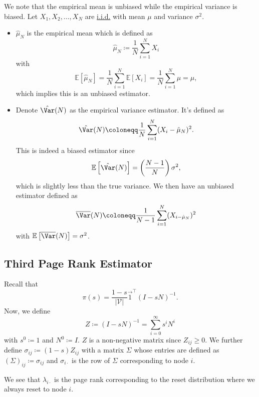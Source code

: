 \begin{note}
	We note that the empirical mean is unbiased while the empirical variance is biased. Let \(X_1, X_2, \dots  ,X_N\) are \hyperref[def:i.i.d.]{i.i.d.} with mean \(\mu\) and variance \(\sigma^2\).
	\begin{itemize}
		\item\(\hat{\mu}_N\) is the empirical mean which is defined as
		\[
			\hat{\mu}_N \coloneqq  \frac{1}{N}\sum\limits_{i=1}^{N} X_i
		\]
		with
		\[
			\mathbb{E}\left[\hat{\mu}_N \right] = \frac{1}{N}\sum\limits_{i=1}^{N} \mathbb{E}\left[X_i \right] = \frac{1}{N}\sum\limits_{i=1}^{N} \mu = \mu,
		\]
		which implies this is an unbiased estimator.
		\item Denote \(\hat{\Var}(N)\) as the empirical variance estimator. It's defined as
		      \[
			      \hat{\Var}(N) \coloneqq \frac{1}{N}\sum\limits_{i=1}^{N} (X_i - \hat{\mu}_N)^2.
		      \]
		      This is indeed a biased estimator since
		      \[
			      \mathbb{E}\left[\hat{\Var}(N) \right]  = \left(\frac{N-1}{N}\right) \sigma^2,
		      \]
		      which is slightly less than the true variance. We then have an unbiased estimator defined as
		      \[
			      \overline{\Var}(N) \coloneqq  \frac{1}{N-1}\sum\limits_{i=1}^{N} (X_{i-\hat{\mu}_N})^2
		      \]
		      with \(\mathbb{E}\left[\overline{\Var}(N) \right]  = \sigma^2\).
	\end{itemize}
\end{note}

\subsection{Third Page Rank Estimator}\label{subsec:third-page-rank-estimator}
Recall that
\[
	\pi(s) = \frac{1 - s}{\left\vert \mathcal{V}  \right\vert}\vec{1}^{\top} (I - sN)^{-1}.
\]
Now, we define
\[
	Z \coloneqq (I - sN)^{-1} = \sum\limits_{i=0}^{\infty} s^i N^i
\]
with \(s^0\coloneqq 1\) and \(N^0\coloneqq I\). \(Z\) is a non-negative matrix since \(Z_{ij}\geq 0\). We further define \(\sigma_{ij}\coloneqq (1 - s)Z_{ij}\) with a matrix \(\Sigma \) whose entries are defined as \(\left(\Sigma\right)_{ij}\coloneqq \sigma_{ij}\) and \(\sigma_{i\cdot}\) is the row of \(\Sigma\) corresponding to node \(i\).

\begin{remark}
	We see that \(\lambda _{i\cdot}\) is the page rank corresponding to the reset distribution where we always reset to node \(i\).
\end{remark}

